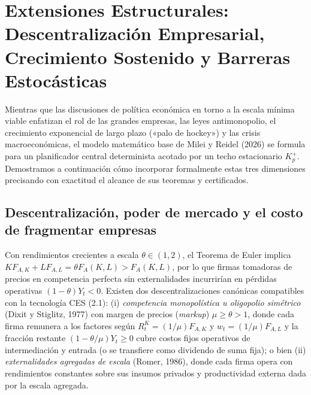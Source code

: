 \documentclass[11pt,letterpaper]{article}
\theoremstyle{plain}
\begin{document}
\section{Extensiones Estructurales: Descentralización Empresarial, Crecimiento Sostenido y Barreras Estocásticas}

Mientras que las discusiones de política económica en torno a la escala mínima viable enfatizan el rol de las grandes empresas, las leyes antimonopolio, el crecimiento exponencial de largo plazo («palo de hockey») y las crisis macroeconómicas, el modelo matemático base de Milei y Reidel (2026) se formula para un planificador central determinista acotado por un techo estacionario $K_p^+$. Demostramos a continuación cómo incorporar formalmente estas tres dimensiones precisando con exactitud el alcance de sus teoremas y certificados.

\subsection{Descentralización, poder de mercado y el costo de fragmentar empresas}

Con rendimientos crecientes a escala $\theta\in(1,2)$, el Teorema de Euler implica $KF_{A,K}+LF_{A,L}=\theta F_A(K,L) > F_A(K,L)$, por lo que firmas tomadoras de precios en competencia perfecta sin externalidades incurrirían en pérdidas operativas $(1-\theta)Y_t<0$. Existen dos descentralizaciones canónicas compatibles con la tecnología CES (2.1): (i) \emph{competencia monopolística u oligopolio simétrico} (Dixit y Stiglitz, 1977) con margen de precios (\emph{markup}) $\mu\ge\theta>1$, donde cada firma remunera a los factores según $R_t^K=(1/\mu)F_{A,K}$ y $w_t=(1/\mu)F_{A,L}$ y la fracción restante $(1-\theta/\mu)Y_t\ge 0$ cubre costos fijos operativos de intermediación y entrada (o se transfiere como dividendo de suma fija); o bien (ii) \emph{externalidades agregadas de escala} (Romer, 1986), donde cada firma opera con rendimientos constantes sobre sus insumos privados y productividad externa dada por la escala agregada.
\end{document}
